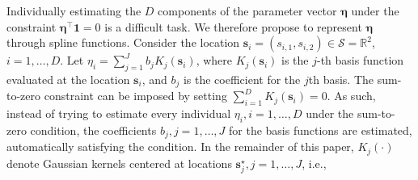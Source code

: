 \documentclass[12pt]{article}
\begin{document}
Individually estimating the $D$ components of the parameter vector $\bm \eta$ under the constraint $\bm \eta^\top \bm 1=0$ is a difficult task. We therefore propose to represent $\bm \eta$ through spline functions. Consider the location $\bm s_i = (s_{i,1}, s_{i,2}) \in \mathcal{S}=\mathbb{R}^2$, $i=1, \ldots, D$. Let $\eta_i = \sum_{j=1}^J b_{j}K_j(\bm s_i)$, where $K_j(\bm s_i)$ is the $j$-th basis function evaluated at the location $\bm s_i$, and $b_j$ is the coefficient for the $j$th basis. The sum-to-zero constraint can be imposed by setting $\sum_{i=1}^D K_j(\bm s_i)=0$. As such, instead of trying to estimate every individual $\eta_i,i=1,\dots,D$ under the sum-to-zero condition, the coefficients $b_j,j=1,\dots,J$ for the basis functions are estimated, automatically satisfying the condition.
%
In the remainder of this paper, $K_j(\cdot)$ denote Gaussian kernels centered at locations $\bm s_j^\star, j=1,\dots,J$, i.e.,
\end{document}
